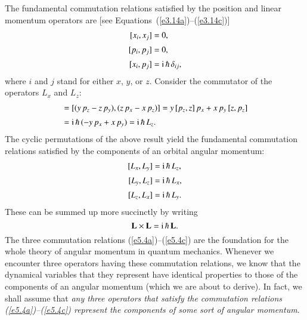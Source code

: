 The fundamental commutation relations satisfied by the
position  and linear momentum operators are [see Equations~(\ref{e3.14a})--(\ref{e3.14c})]
\begin{align}\label{e5.2a}
[x_i, x_j] &=0,\\[0.5ex]
[p_i, p_j] &=0,\\[0.5ex]
[x_i, p_j] &= {\rm i}\,\hbar \,\delta_{ij},\label{e5.2c}
\end{align}
where $i$ and $j$ stand for either $x$, $y$, or $z$. 
Consider the commutator of the operators $L_x$ and $L_z$:
\begin{align}
[L_x, L_y] &= [(y\,p_z-z\,p_y), (z\,p_x-x \,p_z)]
= y\,[p_z, z]\,p_x + x\,p_y\,[z, p_z] \nonumber\\[0.5ex]
&= {\rm i}\,\hbar\,(-y \,p_x+ x\,p_y) = {\rm i}\,\hbar\, L_z.
\end{align}
The cyclic permutations of the above result yield
the fundamental commutation relations satisfied 
by the   components of an orbital angular momentum:
\begin{align}\label{e5.4a}
[L_x, L_y] &= {\rm i}\,\hbar\, L_z,\\[0.5ex]
[L_y, L_z] &= {\rm i}\,\hbar\, L_x,\\[0.5ex]
[L_z, L_x] &= {\rm i}\,\hbar\, L_y.\label{e5.4c}
\end{align}
These can be summed up more succinctly by writing
\begin{equation}\label{e5.5}
{\bf L}\times {\bf L} = {\rm i}\,\hbar \,{\bf L}.
\end{equation}
The three commutation relations (\ref{e5.4a})--(\ref{e5.4c})  are the foundation for the whole
theory of angular momentum in quantum mechanics. Whenever we encounter 
three operators having these commutation relations, we know that the
dynamical variables  that they represent have identical properties
to those of the components of an
 angular momentum (which we are about to derive). In fact,
we shall  assume that {\em any three operators that satisfy the commutation
relations (\ref{e5.4a})--(\ref{e5.4c}) represent the components of some sort of angular momentum}. 

